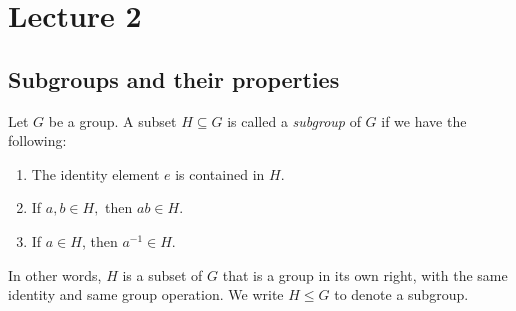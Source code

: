 \section{Lecture 2}
\subsection{Subgroups and their properties}
 \begin{definition}
    Let $G$ be a group. A subset $H \subseteq G$ is called a \emph{subgroup} of $G$ if we have the following:

    \begin{enumerate}
        \item The identity element $e$ is contained in $H$.
        \item If $a,b \in H,$ then $ab \in H$.
        \item If $a \in H$, then $a^{-1} \in H.$
    \end{enumerate}
   \label{subgroup}
 \end{definition}
In other words, $H$ is a subset of $G$ that is a group in its own right, with the same identity and same group operation. We write $H\leq G$ to denote a subgroup.


